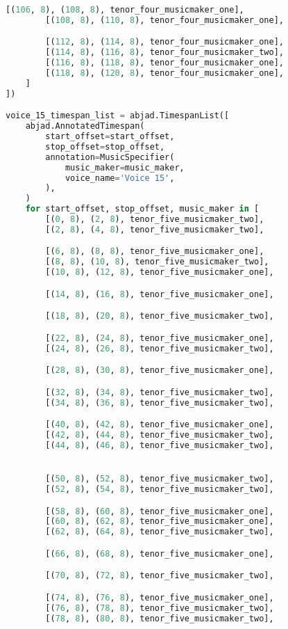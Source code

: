 \begin{lstlisting}[language=Python, caption=Invocation Source Code]
        [(106, 8), (108, 8), tenor_four_musicmaker_one],
        [(108, 8), (110, 8), tenor_four_musicmaker_one],

        [(112, 8), (114, 8), tenor_four_musicmaker_one],
        [(114, 8), (116, 8), tenor_four_musicmaker_two],
        [(116, 8), (118, 8), tenor_four_musicmaker_one],
        [(118, 8), (120, 8), tenor_four_musicmaker_one],
    ]
])

voice_15_timespan_list = abjad.TimespanList([
    abjad.AnnotatedTimespan(
        start_offset=start_offset,
        stop_offset=stop_offset,
        annotation=MusicSpecifier(
            music_maker=music_maker,
            voice_name='Voice 15',
        ),
    )
    for start_offset, stop_offset, music_maker in [
        [(0, 8), (2, 8), tenor_five_musicmaker_two],
        [(2, 8), (4, 8), tenor_five_musicmaker_two],

        [(6, 8), (8, 8), tenor_five_musicmaker_one],
        [(8, 8), (10, 8), tenor_five_musicmaker_two],
        [(10, 8), (12, 8), tenor_five_musicmaker_one],

        [(14, 8), (16, 8), tenor_five_musicmaker_one],

        [(18, 8), (20, 8), tenor_five_musicmaker_two],

        [(22, 8), (24, 8), tenor_five_musicmaker_one],
        [(24, 8), (26, 8), tenor_five_musicmaker_two],

        [(28, 8), (30, 8), tenor_five_musicmaker_one],

        [(32, 8), (34, 8), tenor_five_musicmaker_two],
        [(34, 8), (36, 8), tenor_five_musicmaker_two],

        [(40, 8), (42, 8), tenor_five_musicmaker_one],
        [(42, 8), (44, 8), tenor_five_musicmaker_two],
        [(44, 8), (46, 8), tenor_five_musicmaker_two],


        [(50, 8), (52, 8), tenor_five_musicmaker_two],
        [(52, 8), (54, 8), tenor_five_musicmaker_two],

        [(58, 8), (60, 8), tenor_five_musicmaker_one],
        [(60, 8), (62, 8), tenor_five_musicmaker_one],
        [(62, 8), (64, 8), tenor_five_musicmaker_two],

        [(66, 8), (68, 8), tenor_five_musicmaker_one],

        [(70, 8), (72, 8), tenor_five_musicmaker_two],

        [(74, 8), (76, 8), tenor_five_musicmaker_one],
        [(76, 8), (78, 8), tenor_five_musicmaker_two],
        [(78, 8), (80, 8), tenor_five_musicmaker_two],


\end{lstlisting}
